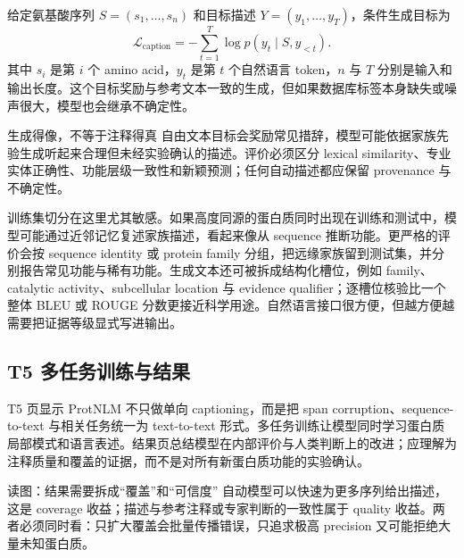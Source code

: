 

给定氨基酸序列 $S=(s_1,\ldots,s_n)$ 和目标描述 $Y=(y_1,\ldots,y_T)$，条件生成目标为
$$
\mathcal{L}_{\text{caption}}=-\sum_{t=1}^{T}\log p(y_t\mid S,y_{<t}).
$$
其中 $s_i$ 是第 $i$ 个 amino acid，$y_t$ 是第 $t$ 个自然语言 token，$n$ 与 $T$ 分别是输入和输出长度。这个目标奖励与参考文本一致的生成，但如果数据库标签本身缺失或噪声很大，模型也会继承不确定性。

\begin{warningbox}{生成得像，不等于注释得真}
自由文本目标会奖励常见措辞，模型可能依据家族先验生成听起来合理但未经实验确认的描述。评价必须区分 lexical similarity、专业实体正确性、功能层级一致性和新颖预测；任何自动描述都应保留 provenance 与不确定性。
\end{warningbox}

训练集切分在这里尤其敏感。如果高度同源的蛋白质同时出现在训练和测试中，模型可能通过近邻记忆复述家族描述，看起来像从 sequence 推断功能。更严格的评价会按 sequence identity 或 protein family 分组，把远缘家族留到测试集，并分别报告常见功能与稀有功能。生成文本还可被拆成结构化槽位，例如 family、catalytic activity、subcellular location 与 evidence qualifier；逐槽位核验比一个整体 BLEU 或 ROUGE 分数更接近科学用途。自然语言接口很方便，但越方便越需要把证据等级显式写进输出。

\subsection{T5 多任务训练与结果}

T5 页显示 ProtNLM 不只做单向 captioning，而是把 span corruption、sequence-to-text 与相关任务统一为 text-to-text 形式。多任务训练让模型同时学习蛋白质局部模式和语言表述。结果页总结模型在内部评价与人类判断上的改进；应理解为注释质量和覆盖的证据，而不是对所有新蛋白质功能的实验确认。



\begin{knowledgebox}{读图：结果需要拆成“覆盖”和“可信度”}
自动模型可以快速为更多序列给出描述，这是 coverage 收益；描述与参考注释或专家判断的一致性属于 quality 收益。两者必须同时看：只扩大覆盖会批量传播错误，只追求极高 precision 又可能拒绝大量未知蛋白质。
\end{knowledgebox}

